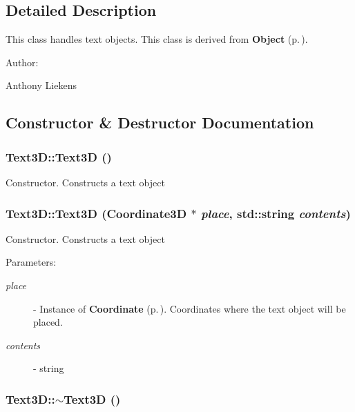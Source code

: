 \subsection{Detailed Description}
This class handles text objects. This class is derived from {\bf Object} {\rm (p.\,\pageref{classObject})}. \begin{Desc}
\item[Author: ]\par
Anthony Liekens \end{Desc}




\subsection{Constructor \& Destructor Documentation}
\subsubsection{\setlength{\rightskip}{0pt plus 5cm}Text3D::Text3D ()}\label{classText3D_a0}


Constructor. Constructs a text object 
\subsubsection{\setlength{\rightskip}{0pt plus 5cm}Text3D::Text3D ({\bf Coordinate3D} $\ast$ {\em place}, std::string {\em contents})}\label{classText3D_a1}


Constructor. Constructs a text object \begin{Desc}
\item[Parameters: ]\par
\begin{description}
\item[{\em 
place}]- Instance of {\bf Coordinate} {\rm (p.\,\pageref{classCoordinate})}. Coordinates where the text object will be placed. \item[{\em 
contents}]- string \end{description}
\end{Desc}
\subsubsection{\setlength{\rightskip}{0pt plus 5cm}Text3D::$\sim$Text3D ()}\label{classText3D_a2}




